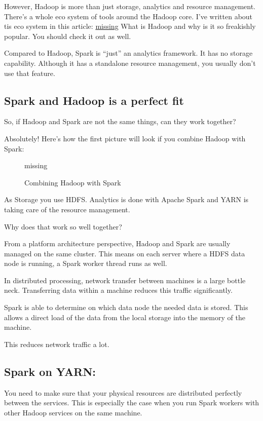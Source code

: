 \documentclass[12pt, numbers=noenddot]{scrreprt} %
\begin{document}
However, Hadoop is more than just storage, analytics and resource management. There’s a whole eco system of tools around the Hadoop core. I’ve written about tis eco system in this article: \url{missing} What is Hadoop and why is it so freakishly popular. You should check it out as well.

Compared to Hadoop, Spark is “just” an analytics framework. It has no storage capability. Although it has a standalone resource management, you usually don’t use that feature.

\subsection{Spark and Hadoop is a perfect fit}
So, if Hadoop and Spark are not the same things, can they work together?

Absolutely! Here’s how the first picture will look if you combine Hadoop with Spark:

\begin{figure}[htbp]
  \centering
     missing
  \caption{Combining Hadoop with Spark}
  \label{fig:Bild2}
\end{figure}

As Storage you use HDFS. Analytics is done with Apache Spark and YARN is taking care of the resource management.

Why does that work so well together?

From a platform architecture perspective, Hadoop and Spark are usually managed on the same cluster. This means on each server where a HDFS data node is running, a Spark worker thread runs as well.

In distributed processing, network transfer between machines is a large bottle neck. Transferring data within a machine reduces this traffic significantly.

Spark is able to determine on which data node the needed data is stored. This allows a direct load of the data from the local storage into the memory of the machine.

This reduces network traffic a lot.

\subsection{Spark on YARN:} You need to make sure that your physical resources are distributed perfectly between the services. This is especially the case when you run Spark workers with other Hadoop services on the same machine.
\end{document}
